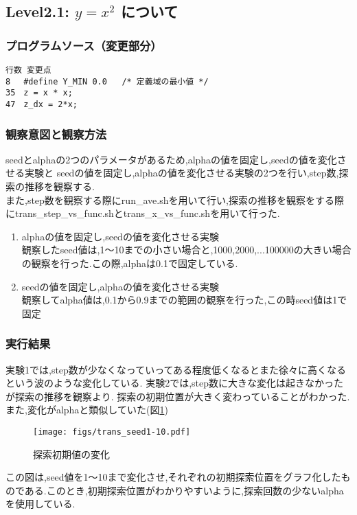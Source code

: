 \subsection{Level2.1: $y=x^2$ について}
\subsubsection{プログラムソース（変更部分）}
\begin{breakbox}
\begin{verbatim}
行数 変更点
8 　#define Y_MIN 0.0   /* 定義域の最小値 */
35　z = x * x;
47　z_dx = 2*x;
\end{verbatim}
\end{breakbox}

\subsubsection{観察意図と観察方法}
seedとalphaの2つのパラメータがあるため,alphaの値を固定し,seedの値を変化させる実験と
seedの値を固定し,alphaの値を変化させる実験の2つを行い,step数,探索の推移を観察する.\\
また,step数を観察する際にrun\_ave.shを用いて行い,探索の推移を観察をする際にtrans\_step\_vs\_func.shとtrans\_x\_vs\_func.shを用いて行った.\\

\begin{enumerate}
	\item  alphaの値を固定し,seedの値を変化させる実験\\
		観察したseed値は,1〜10までの小さい場合と,1000,2000,...100000の大きい場合の観察を行った.この際,alphaは0.1で固定している.
	\item seedの値を固定し,alphaの値を変化させる実験\\
		観察してalpha値は,0.1から0.9までの範囲の観察を行った,この時seed値は1で固定
\end{enumerate}

\subsubsection{実行結果}
実験1では,step数が少なくなっていってある程度低くなるとまた徐々に高くなるという波のような変化している.
実験2では,step数に大きな変化は起きなかったが探索の推移を観察より.
探索の初期位置が大きく変わっていることがわかった.
また,変化がalphaと類似していた(図\ref{trans_seed})

\begin{figure}[h]
 \begin{center}
  \texttt{[image: figs/trans\_seed1-10.pdf]}
  \caption{探索初期値の変化}
	\label{trans_seed}
 \end{center}
\end{figure}
この図は,seed値を1〜10まで変化させ,それぞれの初期探索位置をグラフ化したものである.このとき,初期探索位置がわかりやすいように,探索回数の少ないalphaを使用している.

